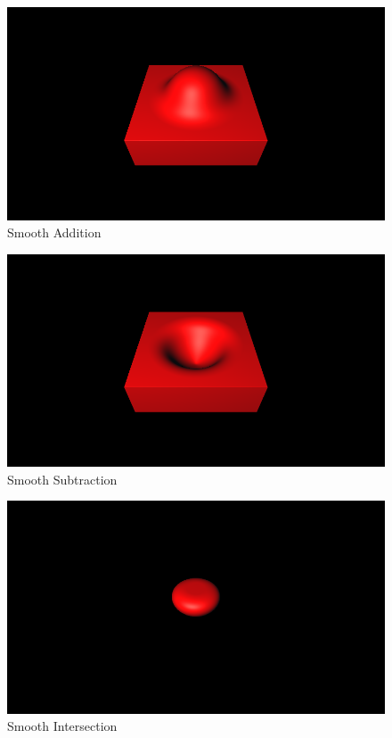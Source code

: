 \begin{figure}[h!]
    \vspace{1em} %

    \begin{minipage}{0.3\textwidth}
        \centering
        \includegraphics[width=\linewidth]{imagens/smooth-sdf-operations/add-smooth.png}\\
        Smooth Addition
    \end{minipage}%
    \hfill
    \begin{minipage}{0.3\textwidth}
        \centering
        \includegraphics[width=\linewidth]{imagens/smooth-sdf-operations/subtraction-smooth.png}\\
        Smooth Subtraction
    \end{minipage}%
    \hfill
    \begin{minipage}{0.3\textwidth}
        \centering
        \includegraphics[width=\linewidth]{imagens/smooth-sdf-operations/intersection-smooth.png}\\
        Smooth Intersection
    \end{minipage}


\end{figure}
